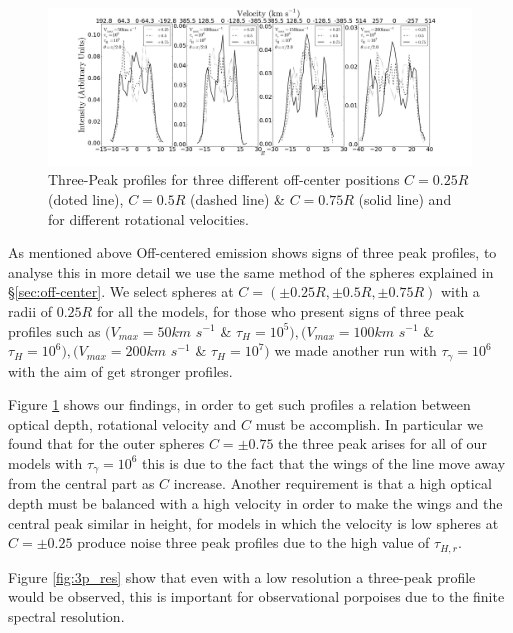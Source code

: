 \documentclass{emulateapj}
\begin{document}
\begin{figure}
\includegraphics[scale=0.3]{3peaks.png}
\caption{Three-Peak profiles for three different off-center positions $C=0.25R$ (doted line), $C=0.5R$ (dashed line) \& $C=0.75R$ (solid line) and for different rotational velocities. 
   \label{fig:3p_profiles}} 
\end{figure}

As mentioned above Off-centered emission shows signs of three peak 
profiles, to analyse this in more detail we use the same method of the spheres
explained in \S \ref{sec:off-center}. We select spheres at $C=(\pm 0.25R, \pm0.5R, \pm0.75R)$ with a radii of
$0.25R$ for all the models, for those who present signs of three peak profiles such as 
$(V_{max}=50km$ $s^{-1}$ \& $\tau_{H}=10^{5}), (V_{max}=100km$ $s^{-1}$ \& $\tau_{H}=10^{6}), 
(V_{max}=200km$ $s^{-1}$ \& $\tau_{H}=10^{7})$ we made another run with $\tau_{\gamma}=10^{6}$ 
with the aim of get stronger profiles. 

Figure \ref{fig:3p_profiles} shows our findings, in order to get such profiles 
a relation between optical depth, rotational velocity and $C$ must be accomplish.
In particular we found that for the outer spheres $C=\pm 0.75$ the three
peak arises for all of our models with $\tau_{\gamma}=10^{6}$ this is due to 
the fact that the wings of the line move away from the central part as $C$ increase. 
Another requirement is that a high optical depth must be balanced with a high velocity 
in order to make the wings and the central peak similar in 
height, for models in which the velocity is low spheres at $C = \pm 0.25$ produce 
noise three peak profiles due to the high value of $\tau_{H, r}$.

Figure \ref{fig:3p_res} show that even with a low resolution a three-peak profile 
would be observed, this is important for observational porpoises due to the finite 
spectral resolution.
\end{document}
